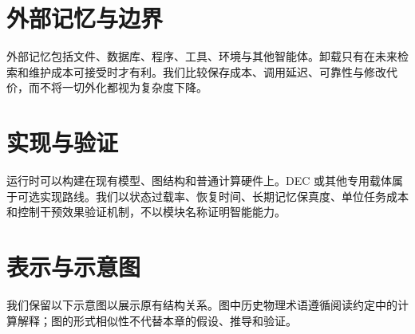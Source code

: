 \section{外部记忆与边界}
外部记忆包括文件、数据库、程序、工具、环境与其他智能体。卸载只有在未来检索和维护成本可接受时才有利。我们比较保存成本、调用延迟、可靠性与修改代价，而不将一切外化都视为复杂度下降。
\section{实现与验证}
运行时可以构建在现有模型、图结构和普通计算硬件上。DEC 或其他专用载体属于可选实现路线。我们以状态过载率、恢复时间、长期记忆保真度、单位任务成本和控制干预效果验证机制，不以模块名称证明智能能力。

\section{表示与示意图}
我们保留以下示意图以展示原有结构关系。图中历史物理术语遵循阅读约定中的计算解释；图的形式相似性不代替本章的假设、推导和验证。

